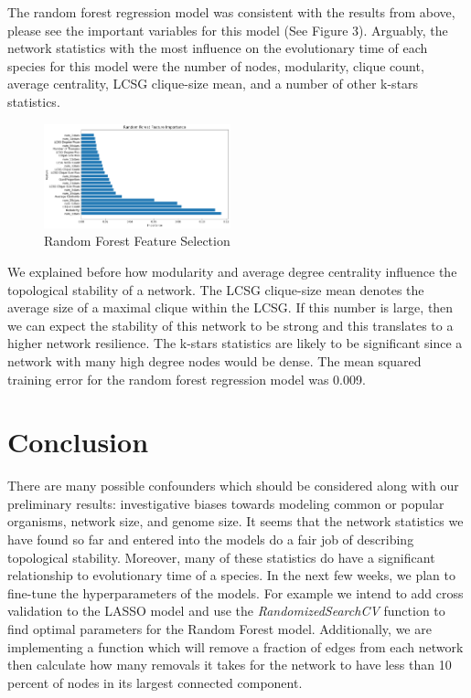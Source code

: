 \documentclass[12pt]{article}
\begin{document}
The random forest regression model was consistent with the results from above, please see the important variables for this model (See Figure 3). Arguably, the network statistics with the most influence on the evolutionary time of each species for this model were the number of nodes, modularity, clique count, average centrality, LCSG clique-size mean, and a number of other k-stars statistics. 
\begin{figure}
  \vspace{-20pt}
  \begin{center}
    \includegraphics[width=0.48\textwidth]{PPIN_fig2}
  \end{center}
  \vspace{-20pt}
  \caption{Random Forest Feature Selection}
  \vspace{-10pt}
\end{figure}

We explained before how modularity and average degree centrality influence the topological stability of a network. The LCSG clique-size mean denotes the average size of a maximal clique within the LCSG. If this number is large, then we can expect the stability of this network to be strong and this translates to a higher network resilience. The k-stars statistics are likely to be significant since a network with many high degree nodes would be dense. The mean squared training error for the random forest regression model was 0.009.

\section{Conclusion}
There are many possible confounders which should be considered along with our preliminary results: investigative biases towards modeling common or popular organisms, network size, and genome size. It seems that the network statistics we have found so far and entered into the models do a fair job of describing topological stability. Moreover, many of these statistics do have a significant relationship to evolutionary time of a species. In the next few weeks, we plan to fine-tune the hyperparameters of the models. For example we intend to add cross validation to the LASSO model and use the \textit{RandomizedSearchCV} function to find optimal parameters for the Random Forest model. Additionally, we are implementing a function which will remove a fraction of edges from each network then calculate how many removals it takes for the network to have less than 10 percent of nodes in its largest connected component. 
\end{document}
